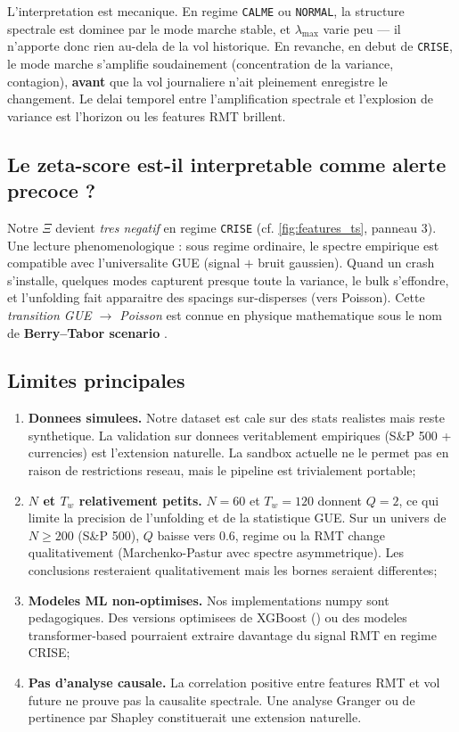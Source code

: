 \documentclass[11pt,a4paper]{article}
\begin{document}
L'interpretation est mecanique. En regime \texttt{CALME} ou \texttt{NORMAL}, la structure spectrale est dominee par le mode marche stable, et $\lambda_{\max}$ varie peu --- il n'apporte donc rien au-dela de la vol historique. En revanche, en debut de \texttt{CRISE}, le mode marche s'amplifie soudainement (concentration de la variance, contagion), \textbf{avant} que la vol journaliere n'ait pleinement enregistre le changement. Le delai temporel entre l'amplification spectrale et l'explosion de variance est l'horizon ou les features RMT brillent.

\subsection{Le zeta-score est-il interpretable comme alerte precoce ?}

Notre $\Xi$ devient \emph{tres negatif} en regime \texttt{CRISE} (cf. \cref{fig:features_ts}, panneau 3). Une lecture phenomenologique : sous regime ordinaire, le spectre empirique est compatible avec l'universalite GUE (signal $+$ bruit gaussien). Quand un crash s'installe, quelques modes capturent presque toute la variance, le bulk s'effondre, et l'unfolding fait apparaitre des spacings sur-disperses (vers Poisson). Cette \emph{transition GUE $\to$ Poisson} est connue en physique mathematique sous le nom de \textbf{Berry--Tabor scenario} \citep{Berry1977}.

\subsection{Limites principales}

\begin{enumerate}[leftmargin=*]
\item \textbf{Donnees simulees.} Notre dataset est cale sur des stats realistes mais reste synthetique. La validation sur donnees veritablement empiriques (S\&P 500 + currencies) est l'extension naturelle. La sandbox actuelle ne le permet pas en raison de restrictions reseau, mais le pipeline est trivialement portable;
\item \textbf{$N$ et $T_w$ relativement petits.} $N = 60$ et $T_w = 120$ donnent $Q = 2$, ce qui limite la precision de l'unfolding et de la statistique GUE. Sur un univers de $N \ge 200$ (S\&P 500), $Q$ baisse vers $0.6$, regime ou la RMT change qualitativement (Marchenko-Pastur avec spectre asymmetrique). Les conclusions resteraient qualitativement mais les bornes seraient differentes;
\item \textbf{Modeles ML non-optimises.} Nos implementations numpy sont pedagogiques. Des versions optimisees de XGBoost (\citealp{Chen2016}) ou des modeles transformer-based pourraient extraire davantage du signal RMT en regime CRISE;
\item \textbf{Pas d'analyse causale.} La correlation positive entre features RMT et vol future ne prouve pas la causalite spectrale. Une analyse Granger ou de pertinence par Shapley constituerait une extension naturelle.
\end{enumerate}
\end{document}
